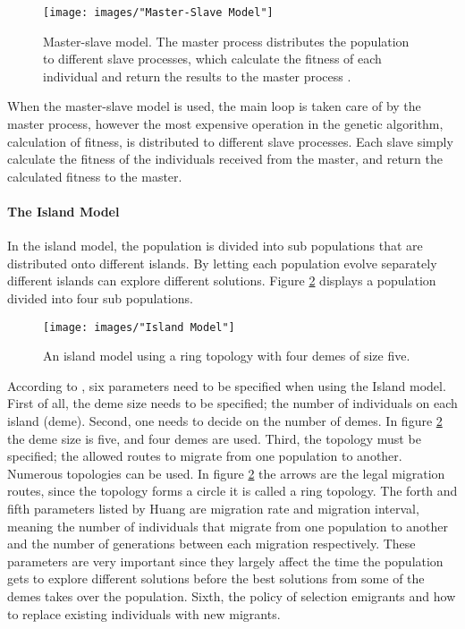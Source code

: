 \begin{figure}[h!]
\begin{center}
\texttt{[image: images/"Master-Slave Model"]}
\caption{Master-slave model. The master process distributes the population to different slave processes, which calculate the fitness of each individual and return the results to the master process \citep{Gong}.}
\label{Master-Slave Model}
\end{center}
\end{figure}


\noindent When the master-slave model is used, the main loop is taken care of by the master process, however the most expensive operation in the genetic algorithm, calculation of fitness, is distributed to different slave processes. Each slave simply calculate the fitness of the individuals received from the master, and return the calculated fitness to the master. 


\paragraph*{The Island Model}
In the island model, the population is divided into sub populations that are distributed onto different islands. By letting each population evolve separately different islands can explore different solutions. Figure \ref{Island model} displays a population divided into four sub populations. \\ 


\begin{figure}[h!]
\begin{center}
\texttt{[image: images/"Island Model"]}
\caption{An island model using a ring topology with four demes of size five. \citep{Gong}}
\label{Island model}
\end{center}
\end{figure}


According to \cite{Huang}, six parameters need to be specified when using the Island model. First of all, the deme size needs to be specified; the number of individuals on each island (deme). Second, one needs to decide on the number of demes. In figure \ref{Island model} the deme size is five, and four demes are used. Third, the topology must be specified; the allowed routes to migrate from one population to another. Numerous topologies can be used. In figure \ref{Island model} the arrows are the legal migration routes, since the topology forms a circle it is called a ring topology. The forth and fifth parameters listed by Huang are migration rate and migration interval, meaning the number of individuals that migrate from one population to another and the number of generations between each migration respectively. These parameters are very important since they largely affect the time the population gets to explore different solutions before the best solutions from some of the demes takes over the population. Sixth, the policy of selection emigrants and how to replace existing individuals with new migrants. \\


